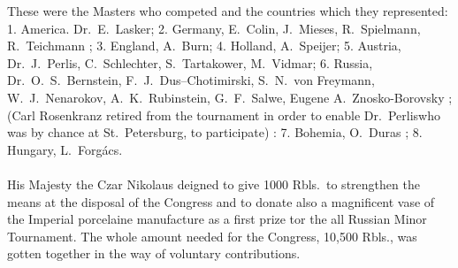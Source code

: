 These were the Masters who competed and the countries which they represented: 1. America. Dr.~E.~Lasker; 2. Germany, E.~Colin, J.~Mieses, R.~Spielmann, R.~Teichmann ; 3. England, A.~Burn; 4. Holland, A.~Speijer; 5. Austria, Dr.~J.~Perlis, C.~Schlechter, S.~Tartakower, M.~Vidmar; 6. Russia, Dr.~O.~S.~Bernstein, F.~J.~Dus--Chotimirski, S.~N.~von Freymann, W.~J.~Nenarokov, A.~K.~Rubinstein, G.~F.~Salwe, Eugene A.~Znosko-Borovsky ; (Carl Rosenkranz retired from the tournament in order to enable Dr.~Perliswho was by chance at St.~Petersburg, to participate) : 7. Bohemia, O.~Duras ; 8. Hungary, L.~Forg\' acs.\\
\vspace{0.2cm}\\
His Majesty the Czar Nikolaus deigned to give 1000 Rbls.~to strengthen the means at the disposal of the Congress and to donate also a magnificent vase of the Imperial porcelaine manufacture as a first prize tor the all Russian Minor Tournament. The whole amount needed for the Congress, 10,500 Rbls., was gotten together in the way of voluntary contributions.